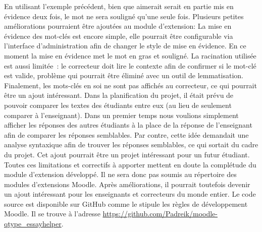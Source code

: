 En utilisant l'exemple pr\'ec\'edent, bien que \og aimerait \fg{} serait en partie mis en \'evidence deux fois, le mot ne sera soulign\'e qu'une seule fois.
Plusieurs petites am\'eliorations pourraient \^etre ajout\'ees au module d'extension:
La mise en \'evidence des mot-cl\'es est encore simple, elle pourrait \^etre configurable via l'interface d'administration afin de changer le style de mise en \'evidence.
En ce moment la mise en \'evidence met le mot en gras et soulign\'e.
La racination utilis\'ee est aussi limit\'ee~: le correcteur doit lire le contexte afin de confirmer si le mot-cl\'e est valide, probl\`eme qui pourrait \^etre \'elimin\'e avec un outil de lemmatisation.
Finalement, les mots-cl\'es en soi ne sont pas affich\'es au correcteur, ce qui pourrait \^etre un ajout int\'eressant.
Dans la planification du projet, il \'etait pr\'evu de pouvoir comparer les textes des \'etudiants entre eux (au lieu de seulement comparer \`a l'enseignant).
Dans un premier temps nous voulions simplement afficher les r\'eponses des autres \'etudiants \`a la place de la r\'eponse de l'enseignant afin de comparer les r\'eponses semblables.
Par contre, cette id\'ee demandait une analyse syntaxique afin de trouver les r\'eponses semblables, ce qui sortait du cadre du projet.
Cet ajout pourrait \^etre un projet int\'eressant pour un futur \'etudiant.
Toutes ces limitations et correctifs \`a apporter mettent en doute la compl\'etude du module d'extension d\'evelopp\'e.
Il ne sera donc pas soumis au r\'epertoire des modules d'extensions Moodle.
Apr\`es am\'eliorations, il pourrait toutefois devenir un ajout int\'eressant pour les enseignants et correcteurs du monde entier.
Le code source est disponible sur GitHub comme le stipule les r\`egles de d\'eveloppement Moodle.
Il se trouve \`a l'adresse \url{https://github.com/Padreik/moodle-qtype_essayhelper}.

